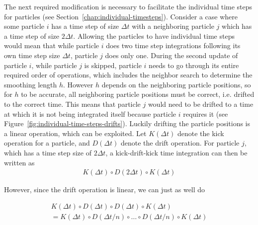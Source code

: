 The next required modification is necessary to facilitate the individual time steps for particles
(see Section~\ref{chap:individual-timesteps}). Consider a case where some
particle $i$ has a time step of size $\Delta t$ with a neighboring particle $j$ which has a time
step of size $2 \Delta t$. Allowing the particles to have individual time steps would mean that
while particle $i$ does two time step integrations following its own time step size $\Delta t$,
particle $j$ does only one. During the second update of particle $i$, while particle $j$ is
skipped, particle $i$ needs to go through its entire required order of operations, which includes
the neighbor search to determine the smoothing length $h$. However $h$ depends on the neighboring
particle positions, so for $h$ to be accurate, all neighboring particle positions must be correct,
i.e. drifted to the correct time. This means that particle $j$ would need to be drifted to a time at
 which it is not being integrated itself because particle $i$ requires it (see
Figure~\ref{fig:individual-time-steps-drifts}). Luckily drifting the particle positions is a linear
operation, which can be exploited. Let $K(\Delta t)$ denote the kick operation for a particle, and
$D(\Delta t)$ denote the drift operation. For particle $j$, which has a time step size of $2 \Delta
t$, a kick-drift-kick time integration can then be written as
\begin{align}
    K(\Delta t) \circ D(2 \Delta t) \circ K(\Delta t)
\end{align}

However, since the drift operation is linear, we can just as well do


\begin{align}
    K(\Delta t) \circ D( \Delta t ) \circ D(\Delta t) \circ K(\Delta t) \\
    = K(\Delta t) \circ D( \Delta t / n ) \circ \hdots \circ D(\Delta t / n) \circ K(\Delta t)
\end{align}


